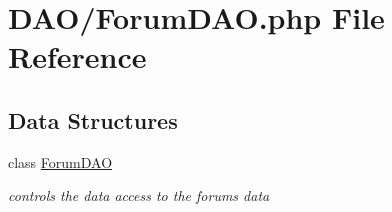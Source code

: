 \hypertarget{_forum_d_a_o_8php}{}\section{D\+A\+O/\+Forum\+D\+AO.php File Reference}
\label{_forum_d_a_o_8php}
\subsection*{Data Structures}
\begin{DoxyCompactItemize}
\item 
class \hyperlink{class_forum_d_a_o}{Forum\+D\+AO}
\begin{DoxyCompactList}\small\item\em controls the data access to the forum\textquotesingle{}s data \end{DoxyCompactList}\end{DoxyCompactItemize}
